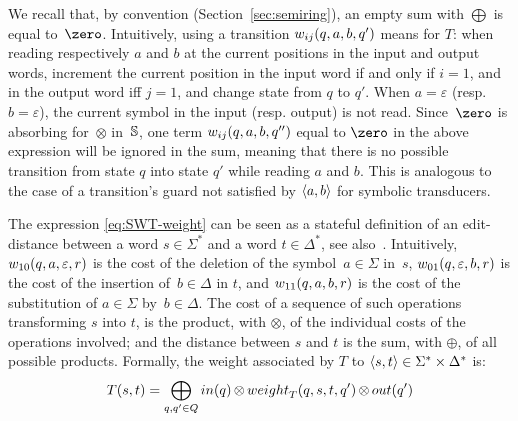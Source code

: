 %
We recall that, by convention (Section~\ref{sec:semiring}),
an empty sum with $\bigoplus$ is equal to~$\zero$.
%
Intuitively, using a transition $\wei_{ij}(q, a, b, q')$ means for $T$:
when reading respectively $a$ and $b$ at the current positions in the input and output words,
increment the current position in the input word if and only if $i = 1$,
and in the output word iff $j = 1$, %
and change state from $q$ to $q'$.
When $a = \varepsilon$ (resp. $b = \varepsilon$), the current symbol
in the input (resp. output) is not read.
%
%
Since~$\zero$ is absorbing for~$\otimes$ in~$\mathbb{S}$,
one term $\wei_{ij}(q, a, b, q'')$ equal to $\zero$ in the above expression
will be ignored in the sum, meaning that there is no possible transition
from state $q$ into state $q'$ while reading $a$ and $b$.
This is analogous to the case of a transition's guard not satisfied by $\<a, b>$ for
symbolic transducers.

%

The expression \eqref{eq:SWT-weight}
can be seen as a stateful definition of
an edit-distance between a word $s \in \Sigma^*$ and a word $t \in \Delta^*$,
see also~\cite{Mohri03ijfcs}.
Intuitively,
$\wei_{10}(q, a, \varepsilon, r)$ is the cost of
the deletion of the symbol~$a \in \Sigma$ in~$s$,
$\wei_{01}(q, \varepsilon, b, r)$ is the cost
of the insertion of~$b \in \Delta$ in $t$,
and $\wei_{11}(q, a, b, r)$ is the cost
of the substitution of  $a \in \Sigma$ by~$b \in \Delta$.
%
The cost of a sequence of such operations transforming $s$ into $t$,
is the product, with $\otimes$, of the individual costs of the operations involved;
and the distance between $s$ and $t$ is the sum, with $\oplus$,
of all possible products.
%
\medskip\noindent
Formally, the weight associated by $T$ to $\< s, t> \in \Sigma^* \times \Delta^*$ is:
\begin{equation}
T(s, t)  =
\displaystyle\bigoplus_{q, q' \in Q} \init(q)
\mathop{\otimes} \weight_T(q, s, t, q') \mathop{\otimes} \final(q')
\label{eq:SWT-value}
\end{equation}

